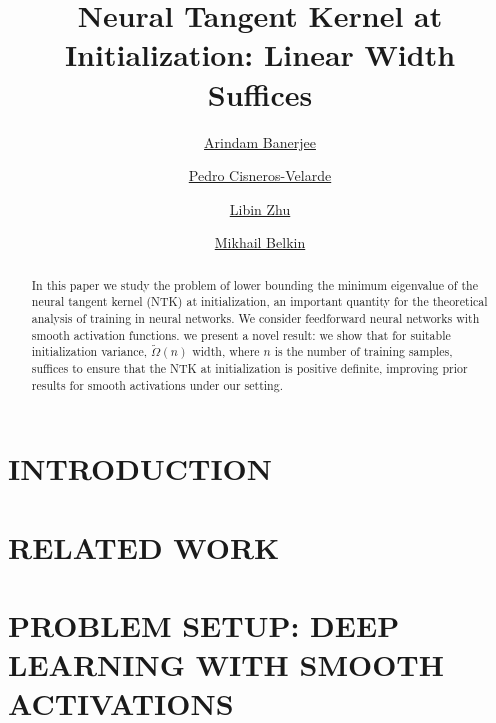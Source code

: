 \documentclass[accepted]{uai2023}
\title{Neural Tangent Kernel at Initialization: Linear Width Suffices}
\author[1]{\href{mailto:<arindamb@illinois.edu>?Subject=Your UAI 2023 paper}
{Arindam Banerjee}{}}
\author[1]{\href{mailto:<pacisne@gmail.com>?Subject=Your UAI 2023 paper}{Pedro Cisneros-Velarde}{}}
\author[2]{\href{mailto:<l5zhu@ucsd.edu>?Subject=Your UAI 2023 paper}{Libin Zhu}{}}
\author[2]{\href{mailto:<mbelkin@ucsd.edu>?Subject=Your UAI 2023 paper}{Mikhail Belkin}{}}
\affil[1]{University of Illinois at Urbana-Champaign}
\affil[2]{University of California, San Diego}
\begin{document}
\maketitle

\begin{abstract}
In this paper we study the problem of lower bounding the minimum eigenvalue of the neural tangent kernel (NTK) at initialization, an important quantity for the theoretical analysis of training in neural networks. We consider feedforward neural networks with smooth activation functions.
 we present a novel result: we show that 
for suitable initialization variance, $\widetilde{\Omega}(n)$ width, where $n$ is the number of training samples, suffices to ensure that the NTK at initialization is positive definite, improving prior results for smooth activations under our setting. 
 
\end{abstract}


\section{INTRODUCTION}
\label{sec:arXiv_intro}


\section{RELATED WORK}
\label{sec:arXiv_related}


\section{PROBLEM SETUP: DEEP LEARNING WITH SMOOTH ACTIVATIONS}
\label{sec:arXiv_dlopt}




% 
\end{document}

